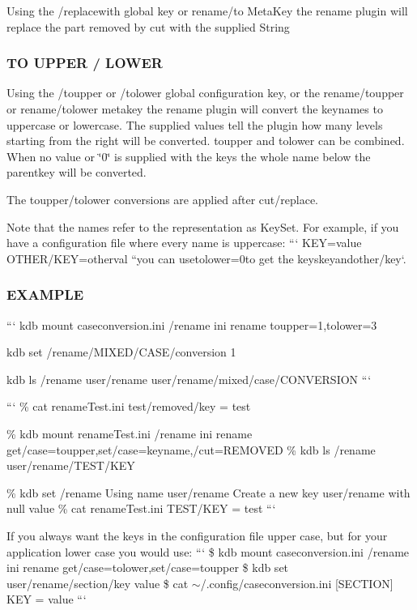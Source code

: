 Using the {\ttfamily /replacewith} global key or {\ttfamily rename/to} Meta\+Key the rename plugin will replace the part removed by {\ttfamily cut} with the supplied String

\subsubsection*{T\+O U\+P\+P\+E\+R / L\+O\+W\+E\+R}

Using the {\ttfamily /toupper} or {\ttfamily /tolower} global configuration key, or the {\ttfamily rename/toupper} or {\ttfamily rename/tolower} metakey the rename plugin will convert the keynames to uppercase or lowercase. The supplied values tell the plugin how many levels starting from the right will be converted. {\ttfamily toupper} and {\ttfamily tolower} can be combined. When no value or \char`\"{}0\char`\"{} is supplied with the keys the whole name below the parentkey will be converted.

The toupper/tolower conversions are applied after cut/replace.

Note that the names refer to the representation as Key\+Set. For example, if you have a configuration file where every name is uppercase\+: ``` K\+E\+Y=value O\+T\+H\+E\+R/\+K\+E\+Y=otherval ``{\ttfamily  you can use}tolower=0{\ttfamily to get the keys}key{\ttfamily and}other/key`.

\subsubsection*{E\+X\+A\+M\+P\+L\+E}

``` kdb mount caseconversion.\+ini /rename ini rename toupper=1,tolower=3

kdb set /rename/\+M\+I\+X\+E\+D/\+C\+A\+S\+E/conversion 1

kdb ls /rename user/rename user/rename/mixed/case/\+C\+O\+N\+V\+E\+R\+S\+I\+O\+N ```

``` \% cat rename\+Test.\+ini test/removed/key = test

\% kdb mount rename\+Test.\+ini /rename ini rename get/case=toupper,set/case=keyname,/cut=R\+E\+M\+O\+V\+E\+D \% kdb ls /rename user/rename/\+T\+E\+S\+T/\+K\+E\+Y

\% kdb set /rename Using name user/rename Create a new key user/rename with null value \% cat rename\+Test.\+ini T\+E\+S\+T/\+K\+E\+Y = test ```

If you always want the keys in the configuration file upper case, but for your application lower case you would use\+: ``` \$ kdb mount caseconversion.\+ini /rename ini rename get/case=tolower,set/case=toupper \$ kdb set user/rename/section/key value \$ cat $\sim$/.config/caseconversion.\+ini \mbox{[}S\+E\+C\+T\+I\+O\+N\mbox{]} K\+E\+Y = value ```

